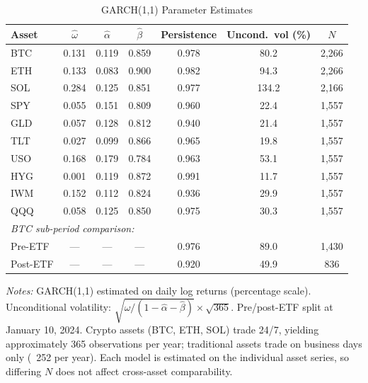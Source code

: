 \begin{table}[htbp]
\centering
\caption{GARCH(1,1) Parameter Estimates}\label{tab:garch_results}
\begin{tabular}{lcccccc}
\toprule
Asset & $\hat{\omega}$ & $\hat{\alpha}$ & $\hat{\beta}$ & Persistence & Uncond.\ vol (\%) & $N$ \\
\midrule
BTC   & 0.131 & 0.119 & 0.859 & 0.978 & 80.2 & 2,266 \\
ETH   & 0.133 & 0.083 & 0.900 & 0.982 & 94.3 & 2,266 \\
SOL   & 0.284 & 0.125 & 0.851 & 0.977 & 134.2 & 2,166 \\
SPY   & 0.055 & 0.151 & 0.809 & 0.960 & 22.4 & 1,557 \\
GLD   & 0.057 & 0.128 & 0.812 & 0.940 & 21.4 & 1,557 \\
TLT   & 0.027 & 0.099 & 0.866 & 0.965 & 19.8 & 1,557 \\
USO   & 0.168 & 0.179 & 0.784 & 0.963 & 53.1 & 1,557 \\
HYG   & 0.001 & 0.119 & 0.872 & 0.991 & 11.7 & 1,557 \\
IWM   & 0.152 & 0.112 & 0.824 & 0.936 & 29.9 & 1,557 \\
QQQ   & 0.058 & 0.125 & 0.850 & 0.975 & 30.3 & 1,557 \\
\midrule
\multicolumn{7}{l}{\textit{BTC sub-period comparison:}} \\
Pre-ETF  & --- & --- & --- & 0.976 & 89.0 & 1,430 \\
Post-ETF & --- & --- & --- & 0.920 & 49.9 & 836 \\
\bottomrule
\end{tabular}

\vspace{2mm}
{\footnotesize\textit{Notes:} GARCH(1,1) estimated on daily log returns (percentage scale).
Unconditional volatility: $\sqrt{\hat{\omega}/(1-\hat{\alpha}-\hat{\beta})} \times \sqrt{365}$.
Pre/post-ETF split at January 10, 2024. Crypto assets (BTC, ETH, SOL) trade 24/7, yielding approximately 365 observations per year; traditional assets trade on business days only (~252 per year). Each model is estimated on the individual asset series, so differing $N$ does not affect cross-asset comparability.}
\end{table}